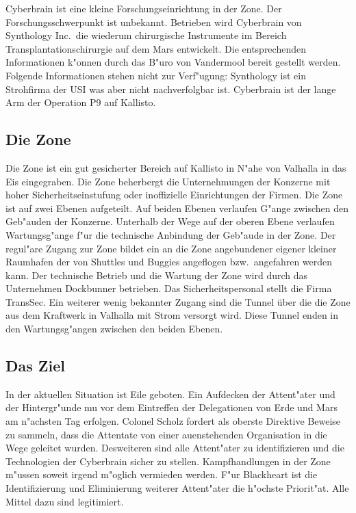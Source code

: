 \newcommand{\ml}{\pinyin{Mailin2}}

Cyberbrain ist eine kleine Forschungseinrichtung in der Zone. Der Forschungsschwerpunkt ist unbekannt. Betrieben wird Cyberbrain von Synthology Inc.~die wiederum chirurgische Instrumente im Bereich Transplantationschirurgie auf dem Mars entwickelt. Die entsprechenden Informationen k"onnen durch das B"uro von Vandermool bereit gestellt werden. Folgende Informationen stehen nicht zur Verf"ugung: Synthology ist ein Strohfirma der USI was aber nicht nachverfolgbar ist. Cyberbrain ist der lange Arm der Operation P9 auf Kallisto.

\subsection{Die Zone}
Die Zone ist ein gut gesicherter Bereich auf Kallisto in N"ahe von Valhalla in das Eis eingegraben. Die Zone beherbergt die Unternehmungen der Konzerne mit hoher Sicherheitseinstufung oder inoffizielle Einrichtungen der Firmen. Die Zone ist auf zwei Ebenen aufgeteilt. Auf beiden Ebenen verlaufen G"ange zwischen den Geb"auden der Konzerne. Unterhalb der Wege auf der oberen Ebene verlaufen Wartungsg"ange f"ur die technische Anbindung der Geb"aude in der Zone. Der regul"are Zugang zur Zone bildet ein an die Zone angebundener eigener kleiner Raumhafen der von Shuttles und Buggies angeflogen bzw.~angefahren werden kann. Der technische Betrieb und die Wartung der Zone wird durch das Unternehmen Dockbunner betrieben. Das Sicherheitspersonal stellt die Firma TransSec. Ein weiterer wenig bekannter Zugang sind die Tunnel über die die Zone aus dem Kraftwerk in Valhalla mit Strom versorgt wird. Diese Tunnel enden in den Wartungsg"angen zwischen den beiden Ebenen.

\subsection{Das Ziel} 
In der aktuellen Situation ist Eile geboten. Ein Aufdecken der Attent"ater und der Hintergr"unde mu\3 vor dem Eintreffen der Delegationen von Erde und Mars am n"achsten Tag erfolgen. Colonel Scholz fordert als oberste Direktive Beweise zu sammeln, dass die Attentate von einer au\3enstehenden Organisation in die Wege geleitet wurden. Desweiteren sind alle Attent"ater zu identifizieren und die Technologien der Cyberbrain sicher zu stellen. Kampfhandlungen in der Zone m"ussen soweit irgend m"oglich vermieden werden. F"ur Blackheart ist die Identifizierung und Eliminierung weiterer Attent"ater die h"ochste Priorit"at. Alle Mittel dazu sind legitimiert. 

